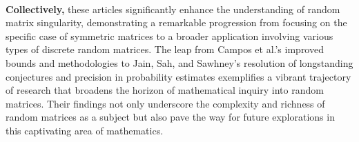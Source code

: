 \\\newline\textbf{Collectively,} these articles significantly enhance the understanding of random matrix singularity, demonstrating a remarkable progression from focusing on the specific case of symmetric matrices to a broader application involving various types of discrete random matrices. The leap from Campos et al.'s improved bounds and methodologies to Jain, Sah, and Sawhney's resolution of longstanding conjectures and precision in probability estimates exemplifies a vibrant trajectory of research that broadens the horizon of mathematical inquiry into random matrices. Their findings not only underscore the complexity and richness of random matrices as a subject but also pave the way for future explorations in this captivating area of mathematics.\\\\
